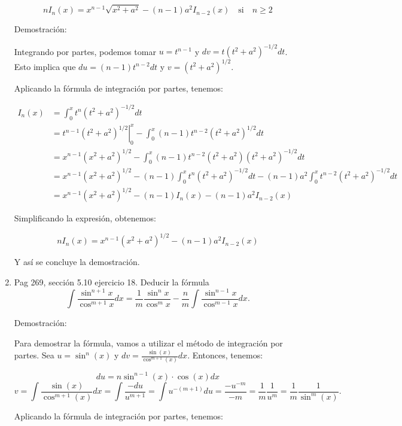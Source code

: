 \documentclass{report}
\begin{document}
\begin{enumerate}
        $$
        n I_{n}(x)=x^{n-1} \sqrt{x^{2}+a^{2}}-(n-1) a^{2} I_{n-2}(x) \quad \text {si} \quad n \geq 2
        $$
        
        Demostración: 
        
        Integrando por partes, podemos tomar $u = t^{n-1}$ y $dv = t(t^2+a^2)^{-1/2}dt$. Esto implica que $du = (n-1)t^{n-2}dt$ y $v = (t^2+a^2)^{1/2}$. 
        
        Aplicando la fórmula de integración por partes, tenemos:
        
        \begin{align*}
        I_{n}(x) &= \int_{0}^{x} t^{n}\left(t^{2}+a^{2}\right)^{-1 / 2} d t \\
        &= \left. t^{n-1}(t^2+a^2)^{1/2} \right|_{0}^{x} - \int_{0}^{x} (n-1)t^{n-2}(t^2+a^2)^{1/2}dt \\
        &= x^{n-1}(x^2+a^2)^{1/2} - \int_{0}^{x} (n-1)t^{n-2}(t^2+a^2)\left(t^2+a^2\right)^{-1/2}dt \\
        &= x^{n-1}(x^2+a^2)^{1/2} - (n-1) \int_{0}^{x} t^n (t^2+a^2)^{-1/2}dt - (n-1)a^2 \int_{0}^{x} t^{n-2}(t^2+a^2)^{-1/2}dt \\
        &= x^{n-1}(x^2+a^2)^{1/2} - (n-1) I_{n}(x) - (n-1)a^2 I_{n-2}(x)
        \end{align*}
        
        Simplificando la expresión, obtenemos:
        
        $$
        n I_{n}(x) = x^{n-1}(x^2+a^2)^{1/2} - (n-1)a^2 I_{n-2}(x)
        $$
        
        Y así se concluye la demostración.
        

        \item Pag 269, sección 5.10 ejercicio 18. Deducir la fórmula
        $$\int \frac{\sin^{n+1} x}{\cos^{m+1} x} dx=\frac{1}{m} \frac{\sin^{n} x}{\cos^{m} x}-\frac{n}{m} \int \frac{\sin^{n-1} x}{\cos^{m-1} x} dx .$$
        
        Demostración:
        
        Para demostrar la fórmula, vamos a utilizar el método de integración por partes. Sea $u = \sin^n(x)$ y $dv = \frac{\sin(x)}{\cos^{m+1}(x)} dx$. Entonces, tenemos:
        
        $$du = n\sin^{n-1}(x) \cdot \cos(x) dx$$
        $$v = \int \frac{\sin(x)}{\cos^{m+1}(x)} dx = \int \frac{-du}{u^{m+1}} = \int u^{-(m+1)} du = \frac{-u^{-m}}{-m} = \frac{1}{m} \frac{1}{u^m} = \frac{1}{m} \frac{1}{\sin^m(x)}.$$
        
        Aplicando la fórmula de integración por partes, tenemos:
        

\end{enumerate}
\end{document}
